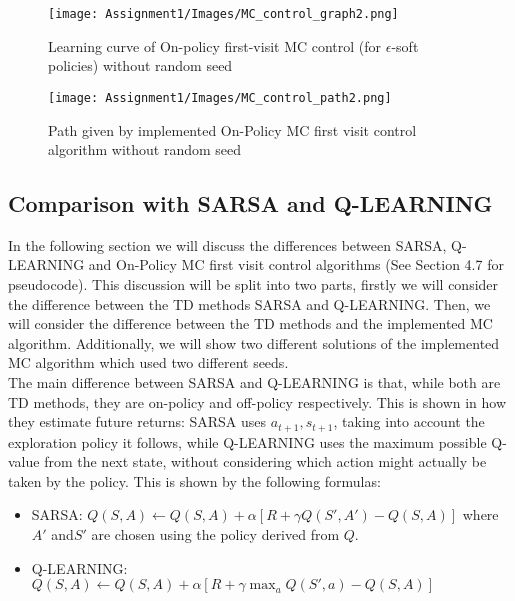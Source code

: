 \documentclass[11pt,a4paper]{article}
\begin{document}
\begin{figure}[h!]
    \centering
    \begin{minipage}{0.55\textwidth}
        \centering
        \texttt{[image: Assignment1/Images/MC\_control\_graph2.png]}
        \caption{Learning curve of On-policy first-visit MC control (for $\epsilon$-soft policies) without random seed}
        \label{fig:fig1}
    \end{minipage}%
    \hfill
    \begin{minipage}{0.4\textwidth}
        \centering
        \texttt{[image: Assignment1/Images/MC\_control\_path2.png]}
        \caption{Path given by implemented On-Policy MC first visit control algorithm without random seed}
        \label{fig:fig2}
    \end{minipage}
\end{figure}

\pagebreak

\subsection{Comparison with SARSA and Q-LEARNING}

In the following section we will discuss the differences between SARSA, Q-LEARNING and On-Policy MC first visit control algorithms (See Section 4.7 for pseudocode). This discussion will be split into two parts, firstly we will consider the difference between the TD methods SARSA and Q-LEARNING. Then, we will consider the difference between the TD methods and the implemented MC algorithm. Additionally, we will show two different solutions of the implemented MC algorithm which used two different seeds. \\

\noindent The main difference between SARSA and Q-LEARNING is that, while both are TD methods, they are on-policy and off-policy respectively. This is shown in how they estimate future returns: SARSA uses $a_{t+1}, s_{t+1}$, taking into account the exploration policy it follows, while Q-LEARNING uses the maximum possible Q-value from the next state, without considering which action might actually be taken by the policy. This is shown by the following formulas:
\begin{itemize}
    \item SARSA: $Q(S, A) \leftarrow Q(S, A) + \alpha \left[ R + \gamma Q(S', A') - Q(S, A) \right]$ where $A'$ and$ S'$ are chosen using the policy derived from $Q$.
    \item Q-LEARNING: $Q(S, A) \leftarrow Q(S, A) + \alpha \left[ R + \gamma \max_a Q(S', a) - Q(S, A) \right]$

\end{itemize}
\end{document}
